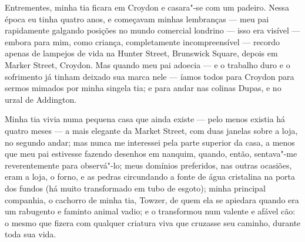 Entrementes, minha tia ficara em Croydon e casara"-se com um padeiro.
Nessa época eu tinha quatro anos, e começavam minhas lembranças --- meu
pai rapidamente galgando posições no mundo comercial londrino --- isso
era visível --- embora para mim, como criança, completamente
incompreensível --- recordo apenas de lampejos de vida na Hunter Street,
Brunswick Square, depois em Marker Street, Croydon. Mas quando meu pai
adoecia --- e o trabalho duro e o sofrimento já tinham deixado sua marca
nele --- íamos todos para Croydon para sermos mimados por minha singela
tia; e para andar nas colinas Dupas, e no urzal de Addington.

Minha tia vivia numa pequena casa que ainda existe --- pelo menos
existia há quatro meses --- a mais elegante da Market Street, com duas
janelas sobre a loja, no segundo andar; mas nunca me interessei pela
parte superior da casa, a menos que meu pai estivesse fazendo desenhos
em nanquim, quando, então, sentava"-me reverentemente para observá"-lo;
meus domínios preferidos, nas outras ocasiões, eram a loja, o forno, e
as pedras circundando a fonte de água cristalina na porta dos fundos (há
muito transformado em tubo de esgoto); minha principal companhia, o
cachorro de minha tia, Towzer, de quem ela se apiedara quando era um
rabugento e faminto animal vadio; e o transformou num valente e afável
cão: o mesmo que fizera com qualquer criatura viva que cruzasse seu
caminho, durante toda sua vida.

